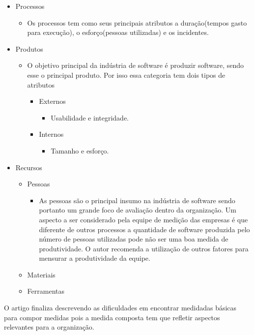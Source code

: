 \documentclass{article}
\begin{document}
\begin{itemize}
\item Processos
    \begin{itemize}
        \item[] Os processos tem como seus principais atributos a duração(tempos gasto para execução), o esforço(pessoas utilizadas) e os incidentes.  
    \end{itemize}

\item Produtos
    \begin{itemize}
        \item[] O objetivo principal da indústria de software é produzir software, sendo esse o principal produto. Por isso essa categoria tem dois tipos de atributos
    \begin{itemize}
        \item Externos
            \begin{itemize}
            \item[] Usabilidade e integridade.
            \end{itemize}
        \item Internos
            \begin{itemize}
            \item[] Tamanho e esforço.
            \end{itemize}
    \end{itemize}
    \end{itemize}


\item Recursos
    \begin{itemize}
        \item[] Pessoas 
            \begin{itemize}
                \item[] As pessoas são o principal insumo na indústria de software sendo portanto um grande foco de avaliação dentro da organização. Um aspecto a ser considerado pela equipe de medição das empresas é que diferente de outros processos a quantidade de software produzida pelo número de pessoas utilizadas pode não ser uma boa medida de produtividade. O autor recomenda a utilização de outros fatores para mensurar a produtividade da equipe. 
            \end{itemize}
        \item[] Materiais
        \item[] Ferramentas
    \end{itemize}
\end{itemize} 

O artigo finaliza descrevendo as dificuldades em encontrar medidadas básicas para compor medidas pois a medida composta tem que refletir aspectos relevantes para a organização. 
\end{document}
